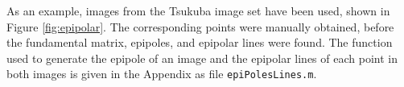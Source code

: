 \documentclass[a4paper, 10pt, conference]{ieeeconf}
\begin{document}
As an example, images from the Tsukuba image set \cite{tsukuba} have been used, shown in Figure \ref{fig:epipolar}. The corresponding points were manually obtained, before the fundamental matrix, epipoles, and epipolar lines were found. The function used to generate the epipole of an image and the epipolar lines of each point in both images is given in the Appendix as file \texttt{epiPolesLines.m}.

\end{document}
